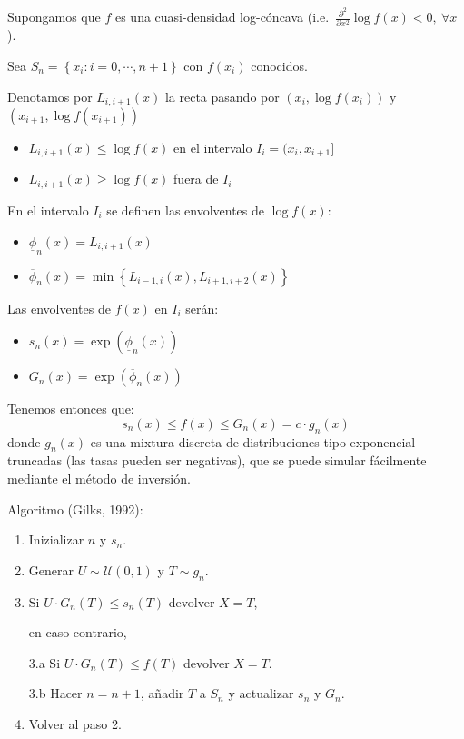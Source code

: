 \documentclass[
]{book}
\theoremstyle{break}
\theoremstyle{definition}
\theoremstyle{definition}
\theoremstyle{definition}
\theoremstyle{remark}
\begin{document}
Supongamos que \(f\) es una cuasi-densidad log-cóncava
(i.e.~\(\frac{\partial ^{2}}{\partial x^{2}}\log f(x) <0, ~\forall x\)).

Sea \(S_n=\left\{ x_{i}:i=0,\cdots ,n+1\right\}\) con
\(f(x_{i})\) conocidos.

Denotamos por \(L_{i,i+1}(x)\) la recta pasando por \(\left( x_{i},\log f(x_{i})\right)\) y \(\left( x_{i+1},\log f(x_{i+1})\right)\)

\begin{itemize}
\item
  \(L_{i,i+1}(x)\leq \log f(x)\) en el intervalo
  \(I_{i}=(x_{i},x_{i+1}]\)
\item
  \(L_{i,i+1}(x)\geq \log f(x)\) fuera de \(I_{i}\)
\end{itemize}

En el intervalo \(I_{i}\) se definen las envolventes de \(\log f\left( x\right)\):

\begin{itemize}
\item
  \(\underline{\phi}_n(x)=L_{i,i+1}(x)\)
\item
  \(\overline{\phi}_n(x)=\min \left\{L_{i-1,i}(x),L_{i+1,i+2}(x)\right\}\)
\end{itemize}

Las envolventes de \(f(x)\) en \(I_{i}\) serán:

\begin{itemize}
\item
  \(s_n(x)=\exp \left( \underline{\phi}_n(x)\right)\)
\item
  \(G_n(x)=\exp \left( \overline{\phi}_n(x)\right)\)
\end{itemize}

Tenemos entonces que:
\[s_n(x)\leq f(x) \leq G_n(x)=c\cdot g_n(x)\]
donde \(g_n(x)\) es una mixtura discreta de distribuciones tipo exponencial truncadas
(las tasas pueden ser negativas),
que se puede simular fácilmente mediante el método de inversión.

Algoritmo (Gilks, 1992):

\begin{enumerate}
\def\labelenumi{\arabic{enumi}.}
\item
  Inizializar \(n\) y \(s_n\).
\item
  Generar \(U \sim \mathcal{U}(0, 1)\) y
  \(T\sim g_n\).
\item
  Si \(U\cdot G_n\left( T\right) \leq s_n\left( T\right)\)
  devolver \(X=T\),

  en caso contrario,

  3.a Si \(U\cdot G_n\left( T\right) \leq f\left( T\right)\)
  devolver \(X=T\).

  3.b Hacer \(n=n+1\), añadir \(T\) a \(S_n\)
  y actualizar \(s_n\) y \(G_n\).
\item
  Volver al paso 2.
\end{enumerate}
\end{document}
